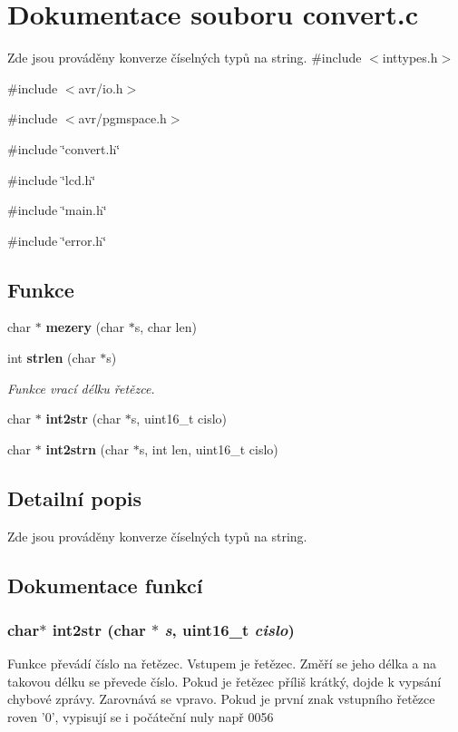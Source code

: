 \section{Dokumentace souboru convert.c}
\label{convert_8c}


Zde jsou prováděny konverze číselných typů na string.  
{\ttfamily \#include $<$inttypes.h$>$}\par
{\ttfamily \#include $<$avr/io.h$>$}\par
{\ttfamily \#include $<$avr/pgmspace.h$>$}\par
{\ttfamily \#include \char`\"{}convert.h\char`\"{}}\par
{\ttfamily \#include \char`\"{}lcd.h\char`\"{}}\par
{\ttfamily \#include \char`\"{}main.h\char`\"{}}\par
{\ttfamily \#include \char`\"{}error.h\char`\"{}}\par
\subsection*{Funkce}
\begin{DoxyCompactItemize}
\item 
char $\ast$ {\bf mezery} (char $\ast$s, char len)
\item 
int {\bf strlen} (char $\ast$s)
\begin{DoxyCompactList}\small\item\em Funkce vrací délku řetězce. \item\end{DoxyCompactList}\item 
char $\ast$ {\bf int2str} (char $\ast$s, uint16\_\-t cislo)
\item 
char $\ast$ {\bf int2strn} (char $\ast$s, int len, uint16\_\-t cislo)
\end{DoxyCompactItemize}


\subsection{Detailní popis}
Zde jsou prováděny konverze číselných typů na string. 

\subsection{Dokumentace funkcí}
\subsubsection[{int2str}]{\setlength{\rightskip}{0pt plus 5cm}char$\ast$ int2str (char $\ast$ {\em s}, \/  uint16\_\-t {\em cislo})}\label{convert_8c_a74ec62624e7d8e4b00205adf77aabb64}
Funkce převádí číslo na řetězec. Vstupem je řetězec. Změří se jeho délka a na takovou délku se převede číslo. Pokud je řetězec příliš krátký, dojde k vypsání chybové zprávy. Zarovnává se vpravo. Pokud je první znak vstupního řetězce roven '0', vypisují se i počáteční nuly např 0056 
